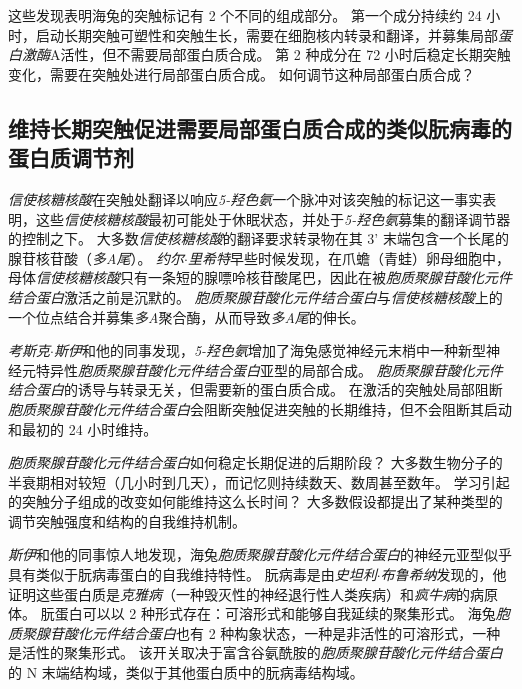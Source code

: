 这些发现表明海兔的突触标记有 2 个不同的组成部分。
第一个成分持续约 24 小时，启动长期突触可塑性和突触生长，需要在细胞核内转录和翻译，并募集局部\textit{蛋白激酶}A活性，但不需要局部蛋白质合成。
第 2 种成分在 72 小时后稳定长期突触变化，需要在突触处进行局部蛋白质合成。
如何调节这种局部蛋白质合成？



\subsection{维持长期突触促进需要局部蛋白质合成的类似朊病毒的蛋白质调节剂}

\textit{信使核糖核酸}在突触处翻译以响应\textit{5-羟色氨}一个脉冲对该突触的标记这一事实表明，这些\textit{信使核糖核酸}最初可能处于休眠状态，并处于\textit{5-羟色氨}募集的翻译调节器的控制之下。
大多数\textit{信使核糖核酸}的翻译要求转录物在其 3' 末端包含一个长尾的腺苷核苷酸（\textit{多A尾}）。
\textit{约尔$\cdot$里希特}早些时候发现，在爪蟾（青蛙）卵母细胞中，母体\textit{信使核糖核酸}只有一条短的腺嘌呤核苷酸尾巴，因此在被\textit{胞质聚腺苷酸化元件结合蛋白}激活之前是沉默的。
\textit{胞质聚腺苷酸化元件结合蛋白}与\textit{信使核糖核酸}上的一个位点结合并募集\textit{多A}聚合酶，从而导致\textit{多A尾}的伸长。


\textit{考斯克$\cdot$斯伊}和他的同事发现，\textit{5-羟色氨}增加了海兔感觉神经元末梢中一种新型神经元特异性\textit{胞质聚腺苷酸化元件结合蛋白}亚型的局部合成。
\textit{胞质聚腺苷酸化元件结合蛋白}的诱导与转录无关，但需要新的蛋白质合成。
在激活的突触处局部阻断\textit{胞质聚腺苷酸化元件结合蛋白}会阻断突触促进突触的长期维持，但不会阻断其启动和最初的 24 小时维持。


\textit{胞质聚腺苷酸化元件结合蛋白}如何稳定长期促进的后期阶段？
大多数生物分子的半衰期相对较短（几小时到几天），而记忆则持续数天、数周甚至数年。
学习引起的突触分子组成的改变如何能维持这么长时间？
大多数假设都提出了某种类型的调节突触强度和结构的自我维持机制。


\textit{斯伊}和他的同事惊人地发现，海兔\textit{胞质聚腺苷酸化元件结合蛋白}的神经元亚型似乎具有类似于朊病毒蛋白的自我维持特性。
朊病毒是由\textit{史坦利$\cdot$布鲁希纳}发现的，他证明这些蛋白质是\textit{克雅病}（一种毁灭性的神经退行性人类疾病）和\textit{疯牛病}的病原体。
朊蛋白可以以 2 种形式存在：可溶形式和能够自我延续的聚集形式。
海兔\textit{胞质聚腺苷酸化元件结合蛋白}也有 2 种构象状态，一种是非活性的可溶形式，一种是活性的聚集形式。
该开关取决于富含谷氨酰胺的\textit{胞质聚腺苷酸化元件结合蛋白}的 N 末端结构域，类似于其他蛋白质中的朊病毒结构域。


